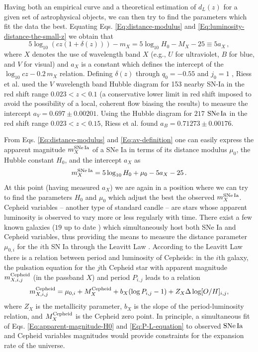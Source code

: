 Having both an empirical curve and a theoretical estimation of $d_L(z)$ for a given set of astrophysical objects, we can then try to find the parameters which fit the data the best. Equating Eqs. \eqref{Eq:distance-modulus} and \eqref{Eq:luminosity-distance-the-small-z} we obtain that
\begin{equation}\label{Eq:av-definition}
5 \log_{10} ( c z ( 1+\delta(z) )) - m_X = 5 \log_{10} H_0 - M_X - 25 \equiv 5 a_X \, ,
\end{equation}
where $X$ denotes the use of wavelength band $X$ (e.g., $U$ for ultraviolet, $B$ for blue, and $V$ for visual) and $a_X$ is a constant which defines the intercept of the $\log_{10} cz - 0.2\, m_X$ relation. Defining $\delta(z)$ through $q_0 = -0.55$ and $j_0 = 1$ \cite{Riess:2006fw}, Riess et al. \cite{Riess:2011yx} used the $V$ wavelength band Hubble diagram for 153 nearby SN-Ia in the red shift range $0.023 < z < 0.1$ (a conservative lower limit in red shift imposed to avoid the possibility of a local, coherent flow biasing the results)
to measure the intercept $a_V = 0.697 \pm 0.00201$. Using the Hubble diagram for $217$ $\mathrm{SNe\,Ia}$ in the red shift range $0.023 < z < 0.15$, Riess et al. \cite{Riess:2016jrr} found $a_B = 0.71273 \pm 0.00176$.

From Eqs. \eqref{Eq:distance-modulus} and \eqref{Eq:av-definition} one can easily express the apparent magnitude $m_X^{\mathrm{SNe\,Ia}}$ of a SNe Ia in terms of its distance modulus $\mu_0$, the Hubble constant $H_0$, and the intercept $a_X$ as
\begin{equation}
m_X^{\mathrm{SNe\,Ia}} =  5 \log_{10} H_0 + \mu_0 - 5 a_X - 25 \, . \label{Eq:apparent-magnitude-H0}
\end{equation}
At this point (having measured $a_X$) we are again in a position where we can try to find the parameters $H_0$ and $\mu_0$ which adjust the best the observed $m^{\mathrm{SNe\,Ia}}_X$. Cepheid variables -- another type of standard candle -- are stars whose apparent luminosity is observed to vary more or less regularly with time. There exist a few known galaxies ($19$ up to date \cite{Riess:2016jrr}) which simultaneously host both SNe Ia and Cepheid variables, thus providing the means to measure the distance parameter $\mu_{0,i}$ for the $i\mathrm{th}$ SN Ia through the Leavitt Law \cite{1912HarCi.173....1L}. According to the Leavitt Law there is a relation between period and luminosity of Cepheids: in the $i\mathrm{th}$ galaxy, the pulsation equation for the $j\mathrm{th}$ Cepheid star with apparent magnitude $m^{\mathrm{Cepheid}}_{X,i,j}$ (in the passband $X$) and period $P_{i,j}$ leads to a relation 
\begin{equation}\label{Eq:P-L-equation}
m^{\mathrm{Cepheid}}_{X,i,j} = \mu_{0,i} + M^{\mathrm{Cepheid}}_X + b_X (\log P_{i,j}-1) + Z_X \Delta \log[O/H]_{i,j},
\end{equation}
where $Z_X$ is the metallicity parameter, $b_X$ is the slope of the period-luminosity relation, and $M^{\mathrm{Cepheid}}_X$ is the Cepheid zero point. In principle, a simultaneous fit of Eqs. \eqref{Eq:apparent-magnitude-H0} and \eqref{Eq:P-L-equation} to observed $\mathrm{SNe\,Ia}$ and Cepheid variables magnitudes would provide constraints for the expansion rate of the universe. 

